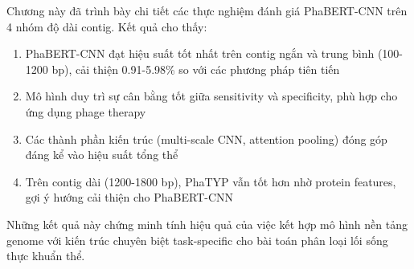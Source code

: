 Chương này đã trình bày chi tiết các thực nghiệm đánh giá PhaBERT-CNN trên 4 nhóm độ dài contig. Kết quả cho thấy:

\begin{enumerate}
    \item PhaBERT-CNN đạt hiệu suất tốt nhất trên contig ngắn và trung bình (100-1200 bp), cải thiện 0.91-5.98\% so với các phương pháp tiên tiến

    \item Mô hình duy trì sự cân bằng tốt giữa sensitivity và specificity, phù hợp cho ứng dụng phage therapy

    \item Các thành phần kiến trúc (multi-scale CNN, attention pooling) đóng góp đáng kể vào hiệu suất tổng thể

    \item Trên contig dài (1200-1800 bp), PhaTYP vẫn tốt hơn nhờ protein features, gợi ý hướng cải thiện cho PhaBERT-CNN
\end{enumerate}

Những kết quả này chứng minh tính hiệu quả của việc kết hợp mô hình nền tảng genome với kiến trúc chuyên biệt task-specific cho bài toán phân loại lối sống thực khuẩn thể.
